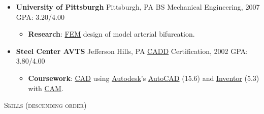 \documentclass{article}
\newcommand{\lineunder}{\vspace*{-8pt} \\ \hspace*{-18pt} \hrulefill \\}
\newcommand{\header}[1]{{\hspace*{-15pt}\vspace*{6pt} \textsc{#1}} \vspace*{-6pt} \lineunder}
\newenvironment{achievements}{\begin{list}{$\bullet$}{\topsep 0pt \itemsep -2pt}}{\vspace*{4pt}\end{list}}
\begin{document}
\begin{itemize}[leftmargin=*]
  \item \textbf{University of Pittsburgh} Pittsburgh, PA BS Mechanical Engineering, 2007 GPA: 3.20/4.00
  \begin{itemize}
    \item \textbf{Research}: \href{http://en.wikipedia.org/wiki/Finite_element_method}{FEM} design of model arterial bifurcation.
  \end{itemize}

  \item \textbf{Steel Center AVTS} Jefferson Hills, PA \href{http://en.wikipedia.org/wiki/Computer-aided_design}{CADD} Certification, 2002 GPA: 3.80/4.00
  \begin{itemize}
    \item \textbf{Coursework}: \href{http://en.wikipedia.org/wiki/Computer-aided_design}{CAD} using \href{http://www.autodesk.com/}{Autodesk}'s \href{http://www.autodesk.com/  products/autocad/overview}{AutoCAD} (15.6) and \href{http://www.autodesk.com/products/autodesk-inventor-family/overview}{Inventor} (5.3) with \href{http://en.wikipedia.org/wiki/Computer-aided_manufacturing}{CAM}.  
  \end{itemize}

\end{itemize}

\header{\Large{Skills (descending order)}}

\end{document}
